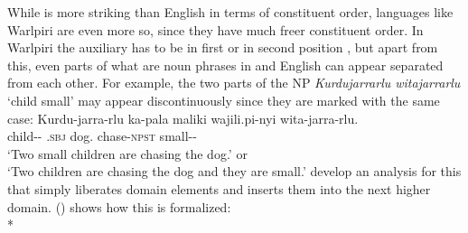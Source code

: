 \documentclass[output=paper]{langsci/langscibook}
\begin{document}
While  is more striking than English in terms of constituent order, languages like
Warlpiri are even more so, since they have much freer constituent order. In
Warlpiri the auxiliary has to be in first or in second position \citep[]{DS99a}, but apart from this, even parts of what are noun
phrases in  and English can appear separated from each other. For example, the two parts of
the NP \emph{Kurdujarrarlu witajarrarlu} `child small' may appear discontinuously since they are marked with
the same case:
\ea
\label{ex-warlpiri}
\gll Kurdu-jarra-rlu  ka-pala                 maliki     wajili.pi-nyi        wita-jarra-rlu.\\
     child-\DU-\ERG{} \DU.\textsc{sbj} dog.\ABS{} chase-\textsc{npst} small-\DU-\ERG\\%
\glt `Two small children are chasing the dog.' or\\
     `Two children are chasing the dog and they are small.'
\z
%
\citet{DS99a} develop an analysis for this that simply liberates domain elements and inserts them
into the next higher domain. () shows how this is formalized:
\ea
{} \impl\\*
\end{document}
